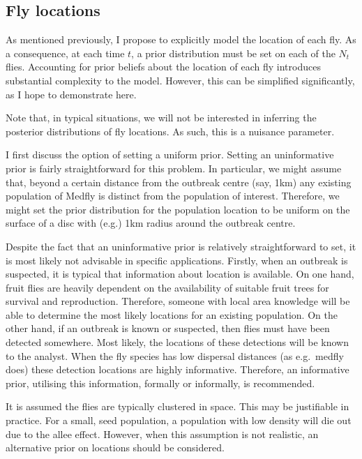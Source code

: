 \documentclass[
  oneside]{book}
\begin{document}
\hypertarget{fly-locations}{%
\subsection{Fly locations}\label{fly-locations}}

As mentioned previously, I propose to explicitly model the location of each fly. As a consequence, at each time \(t\), a prior distribution must be set on each of the \(N_t\) flies. Accounting for prior beliefs about the location of each fly introduces substantial complexity to the model. However, this can be simplified significantly, as I hope to demonstrate here.

Note that, in typical situations, we will not be interested in inferring the posterior distributions of fly locations. As such, this is a nuisance parameter.

I first discuss the option of setting a uniform prior. Setting an uninformative prior is fairly straightforward for this problem. In particular, we might assume that, beyond a certain distance from the outbreak centre (say, 1km) any existing population of Medfly is distinct from the population of interest. Therefore, we might set the prior distribution for the population location to be uniform on the surface of a disc with (e.g.) 1km radius around the outbreak centre.

Despite the fact that an uninformative prior is relatively straightforward to set, it is most likely not advisable in specific applications. Firstly, when an outbreak is suspected, it is typical that information about location is available. On one hand, fruit flies are heavily dependent on the availability of suitable fruit trees for survival and reproduction. Therefore, someone with local area knowledge will be able to determine the most likely locations for an existing population. On the other hand, if an outbreak is known or suspected, then flies must have been detected somewhere. Most likely, the locations of these detections will be known to the analyst. When the fly species has low dispersal distances (as e.g.~medfly does) these detection locations are highly informative. Therefore, an informative prior, utilising this information, formally or informally, is recommended.

It is assumed the flies are typically clustered in space. This may be justifiable in practice. For a small, seed population, a population with low density will die out due to the allee effect. However, when this assumption is not realistic, an alternative prior on locations should be considered.
\end{document}
